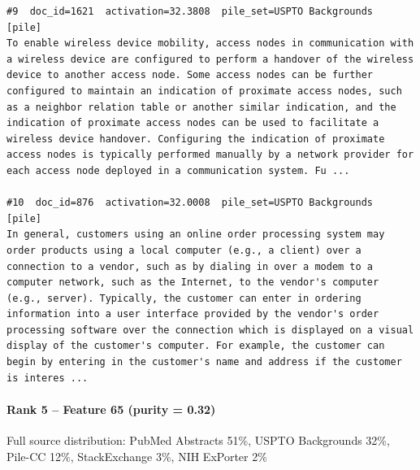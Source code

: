 \begin{verbatim}
#9  doc_id=1621  activation=32.3808  pile_set=USPTO Backgrounds  [pile]
To enable wireless device mobility, access nodes in communication with a wireless device are configured to perform a handover of the wireless device to another access node. Some access nodes can be further configured to maintain an indication of proximate access nodes, such as a neighbor relation table or another similar indication, and the indication of proximate access nodes can be used to facilitate a wireless device handover. Configuring the indication of proximate access nodes is typically performed manually by a network provider for each access node deployed in a communication system. Fu ...

#10  doc_id=876  activation=32.0008  pile_set=USPTO Backgrounds  [pile]
In general, customers using an online order processing system may order products using a local computer (e.g., a client) over a connection to a vendor, such as by dialing in over a modem to a computer network, such as the Internet, to the vendor's computer (e.g., server). Typically, the customer can enter in ordering information into a user interface provided by the vendor's order processing software over the connection which is displayed on a visual display of the customer's computer. For example, the customer can begin by entering in the customer's name and address if the customer is interes ...

\end{verbatim}

\paragraph*{Rank 5 -- Feature 65 (purity = 0.32)}

Full source distribution: PubMed Abstracts 51\%, USPTO Backgrounds 32\%, Pile-CC 12\%, StackExchange 3\%, NIH ExPorter 2\%

